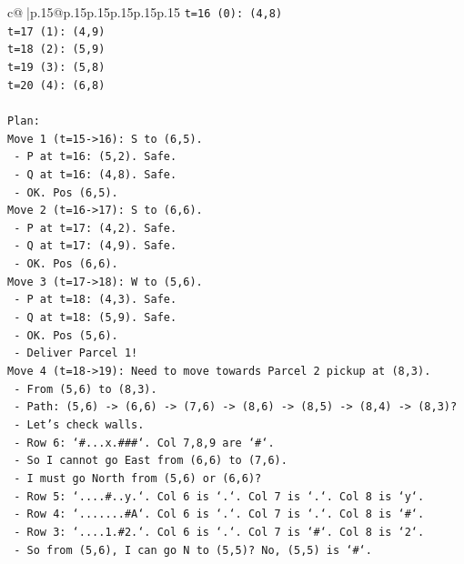 \documentclass{article}
\begin{document}
{\begin{supertabular}{c@{$\;$}|p{.15\linewidth}@{}p{.15\linewidth}p{.15\linewidth}p{.15\linewidth}p{.15\linewidth}p{.15\linewidth}}
{{{\texttt{t=16 (0): (4,8)} \\
\texttt{t=17 (1): (4,9)} \\
\texttt{t=18 (2): (5,9)} \\
\texttt{t=19 (3): (5,8)} \\
\texttt{t=20 (4): (6,8)} \\
\\ 
\texttt{Plan:} \\
\texttt{Move 1 (t=15{-}>16): S to (6,5).} \\
\texttt{  {-} P at t=16: (5,2). Safe.} \\
\texttt{  {-} Q at t=16: (4,8). Safe.} \\
\texttt{  {-} OK. Pos (6,5).} \\
\texttt{Move 2 (t=16{-}>17): S to (6,6).} \\
\texttt{  {-} P at t=17: (4,2). Safe.} \\
\texttt{  {-} Q at t=17: (4,9). Safe.} \\
\texttt{  {-} OK. Pos (6,6).} \\
\texttt{Move 3 (t=17{-}>18): W to (5,6).} \\
\texttt{  {-} P at t=18: (4,3). Safe.} \\
\texttt{  {-} Q at t=18: (5,9). Safe.} \\
\texttt{  {-} OK. Pos (5,6).} \\
\texttt{  {-} Deliver Parcel 1!} \\
\texttt{Move 4 (t=18{-}>19): Need to move towards Parcel 2 pickup at (8,3).} \\
\texttt{  {-} From (5,6) to (8,3).} \\
\texttt{  {-} Path: (5,6) {-}> (6,6) {-}> (7,6) {-}> (8,6) {-}> (8,5) {-}> (8,4) {-}> (8,3)?} \\
\texttt{  {-} Let's check walls.} \\
\texttt{  {-} Row 6: `\#...x.\#\#\#`. Col 7,8,9 are `\#`.} \\
\texttt{  {-} So I cannot go East from (6,6) to (7,6).} \\
\texttt{  {-} I must go North from (5,6) or (6,6)?} \\
\texttt{  {-} Row 5: `....\#..y.`. Col 6 is `.`. Col 7 is `.`. Col 8 is `y`.} \\
\texttt{  {-} Row 4: `.......\#A`. Col 6 is `.`. Col 7 is `.`. Col 8 is `\#`.} \\
\texttt{  {-} Row 3: `....1.\#2.`. Col 6 is `.`. Col 7 is `\#`. Col 8 is `2`.} \\
\texttt{  {-} So from (5,6), I can go N to (5,5)? No, (5,5) is `\#`.} \\
}}}
\end{supertabular}}
\end{document}
